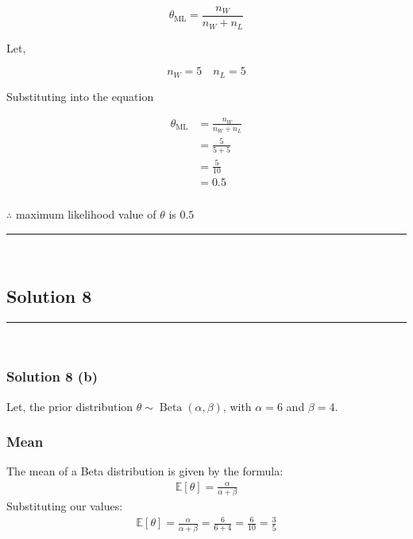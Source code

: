 \documentclass{article}
\begin{document}
$$\theta_{\text{ML}} = \frac{n_W}{n_W +n_L}$$

\begin{flushleft}
    Let,
\end{flushleft}

$$n_W = 5 \quad n_L = 5$$

\begin{flushleft}
    Substituting into the equation
\end{flushleft}

\begin{align*}
    \theta_{\text{ML}} &= \frac{n_W}{n_W +n_L} \\
    &= \frac{5}{5+5} \\
    &= \frac{5}{10} \\
    &= 0.5
\end{align*}

\subsubsection*{\normalfont}{$\therefore$ maximum likelihood value of $\theta$ is $0.5$} \\

\noindent\rule{\textwidth}{0.4pt}\\

\newpage

\subsection*{Solution 8}
\noindent\rule{\textwidth}{0.4pt}\\
\subsubsection*{Solution 8 (b)}
Let, the prior distribution $\theta \sim \operatorname{Beta}(\alpha, \beta)$, with $\alpha = 6$ and $\beta = 4$.

\subsubsection*{Mean}
The mean of a Beta distribution is given by the formula:
\begin{align*}
    \mathbb{E}[\theta] = \frac{\alpha}{\alpha + \beta}
\end{align*}
Substituting our values:
\begin{align*}
    \mathbb{E}[\theta] =  \frac{\alpha}{\alpha + \beta} =\frac{6}{6 + 4} = \frac{6}{10} = \frac{3}{5}
\end{align*}
\end{document}
